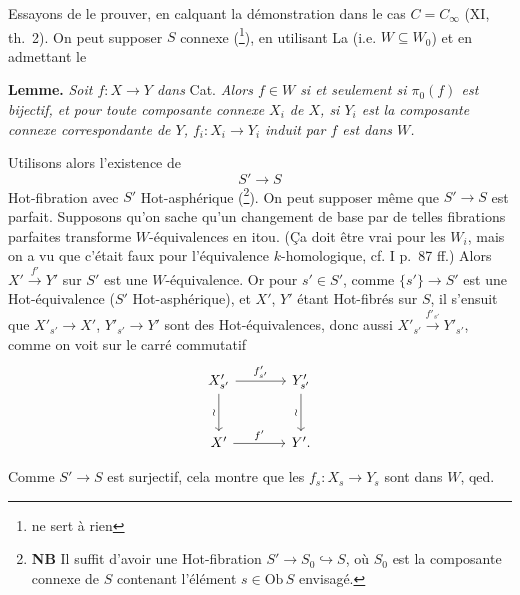 Essayons de le prouver, en calquant la démonstration dans le cas $C = C_\infty$ (XI, th.~2). On peut supposer $S$ connexe (\footnote[14]{ne sert à rien}), en utilisant La (i.e. $W \subseteq W_0$) et en admettant le

\textbf{Lemme.} \textit{Soit $f : X \longrightarrow Y$ dans} Cat. \textit{Alors $f \in W$ si et seulement si $\pi_0(f)$ est bijectif, et pour toute composante connexe $X_i$ de $X$, si $Y_i$ est la composante connexe correspondante de $Y$, $f_i : X_i \longrightarrow Y_i$ induit par $f$ est dans $W$.}

Utilisons alors l'existence de
\[ S' \longrightarrow S \]
Hot-fibration avec $S'$ Hot-asphérique (\footnote[15]{\textbf{NB} Il suffit d'avoir une Hot-fibration $S' \longrightarrow S_0 \hookrightarrow S$, où $S_0$ est la composante connexe de $S$ contenant l'élément $s \in \mathrm{Ob}\,S$ envisagé.}). On peut supposer même que $S' \longrightarrow S$ est parfait. Supposons qu'on sache qu'un changement de base par de telles fibrations parfaites transforme $W$-équivalences en itou. (Ça doit être vrai pour les $W_i$, mais on a vu que c'était faux pour l'équivalence $k$-homologique, cf. I p.~87 ff.) Alors $X' \xrightarrow{f'} Y'$ sur $S'$ est
une $W$-équivalence. Or pour $s' \in S'$, comme $\{s'\} \longrightarrow S'$ est une Hot-équivalence ($S'$ Hot-asphérique), et $X'$, $Y'$ étant Hot-fibrés sur $S$, il s'ensuit que $X'_{s'} \longrightarrow X'$, $Y'_{s'} \longrightarrow Y'$ sont des Hot-équivalences, donc aussi $X'_{s'} \xrightarrow{f'_{s'}} Y'_{s'}$, comme on voit sur le carré commutatif
\[
\begin{tikzcd}[row sep=large, column sep=large]
X'_{s'} \arrow[r, "f'_{s'}"] \arrow[d, "\wr"'] & Y'_{s'} \arrow[d, "\wr"'] \\
X' \arrow[r, "{f'}"] & Y'.
\end{tikzcd}
\]

Comme $S' \longrightarrow S$ est surjectif, cela montre que les $f_s : X_s \longrightarrow Y_s$ sont dans $W$, qed.

